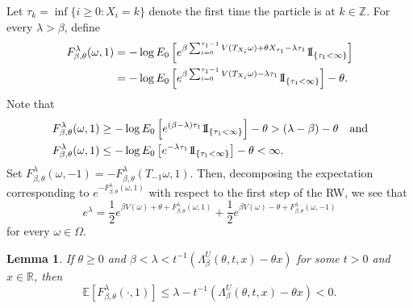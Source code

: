 \documentclass[a4paper]{amsart}
\numberwithin{equation}{section}
\theoremstyle{plain}
\newtheorem{lemma}[theorem]{\sc Lemma}
\theoremstyle{remark}
\begin{document}
Let $\tau_k = \inf\{i\ge0: X_i = k\}$ denote the first time the particle is at $k\in\mathbb{Z}$. For every $\lambda > \beta$, define
\begin{equation}
\begin{aligned}\label{pregaztap}
F_{\beta,\theta}^\lambda(\omega,1) &= - \log E_0\left[e^{\beta\sum_{i=0}^{\tau_1-1}V(T_{X_i}\omega) + \theta X_{\tau_1} - \lambda\tau_1}{{{\rm 1\mkern-1.5mu}\!{\rm I}}}_{\{\tau_1<\infty\}}\right]\\
&= - \log E_0\left[e^{\beta\sum_{i=0}^{\tau_1-1}V(T_{X_i}\omega) - \lambda\tau_1}{{{\rm 1\mkern-1.5mu}\!{\rm I}}}_{\{\tau_1<\infty\}}\right] - \theta.
\end{aligned}
\end{equation}
Note that 
\begin{equation}
\begin{aligned}\label{fbounds}
F_{\beta,\theta}^\lambda(\omega,1) & \ge - \log E_0\left[e^{(\beta - \lambda)\tau_1}{{{\rm 1\mkern-1.5mu}\!{\rm I}}}_{\{\tau_1<\infty\}}\right] - \theta > (\lambda - \beta) - \theta\quad\text{and}\\
F_{\beta,\theta}^\lambda(\omega,1) & \le - \log E_0\left[e^{-\lambda\tau_1}{{{\rm 1\mkern-1.5mu}\!{\rm I}}}_{\{\tau_1<\infty\}}\right] - \theta < \infty.
\end{aligned}
\end{equation}
Set $F_{\beta,\theta}^\lambda(\omega,-1) = - F_{\beta,\theta}^\lambda(T_{-1}\omega,1)$. 
Then, decomposing the expectation corresponding to $e^{-F_{\beta,\theta}^\lambda(\omega,1)}$ with respect to the first step of the RW, we see that
\begin{equation}\label{peeling}
e^\lambda  = \frac1{2}e^{\beta V(\omega) + \theta + F_{\beta,\theta}^\lambda(\omega,1)} + \frac1{2}e^{\beta V(\omega) - \theta + F_{\beta,\theta}^\lambda(\omega,-1)}
\end{equation}
for every $\omega\in\Omega$.

\begin{lemma}\label{decomp}
If $\theta\ge0$ and $\beta < \lambda < t^{-1}\left(\Lambda_\beta^U(\theta,t,x) - \theta x\right)$ for some $t>0$ and $x\in\mathbb{R}$, then $$\mathbb{E}[F_{\beta,\theta}^\lambda(\cdot,1)] \le \lambda  - t^{-1}\left(\Lambda_\beta^U(\theta,t,x) - \theta x\right) < 0.$$
\end{lemma}
\end{document}
